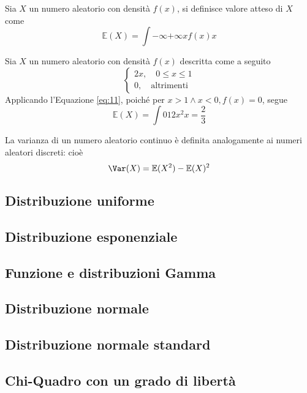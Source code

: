 \documentclass{subfiles}
\begin{document}
\begin{Definition*}
    Sia \(X\) un numero aleatorio con densità \(f(x)\), si definisce valore atteso di \(X\) come
    \begin{equation}
        \mathbb{E}(X) = \int{-\infty}{+\infty}{x f(x)}{x}
    \end{equation}
\end{Definition*}
\begin{Example*}
    Sia \(X\) un numero aleatorio con densità \(f(x)\) descritta come a seguito
    \[\begin{cases}
            2x,  \quad 0 \le x \le 1 \\
            0, \quad \text{altrimenti}
        \end{cases}\]
    Applicando l'Equazione \eqref{eq:11},  poiché per \(x > 1 \land x < 0, f(x) = 0\), segue
    \[
        \mathbb{E}(X) = \int{0}{1}{2x^{2}}{x} = \frac{2}{3}
    \]

    \noindent
    La varianza di un numero aleatorio continuo è definita analogamente ai numeri aleatori discreti: cioè
    \[
        \Var(X) = \mathbb{E}(X^{2}) - \mathbb{E}(X)^{2}
    \]
\end{Example*}

\subsection{Distribuzione uniforme}


\subsection{Distribuzione esponenziale}


\subsection{Funzione e distribuzioni Gamma}


\subsection{Distribuzione normale}


\subsection{Distribuzione normale standard}


\subsection{Chi-Quadro con un grado di libertà}

\end{document}
